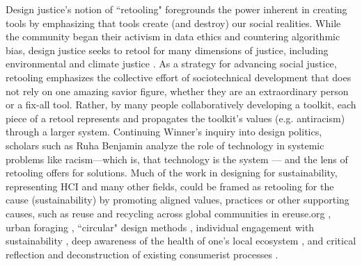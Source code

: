 Design justice's notion of ``retooling" foregrounds the power inherent in creating tools by emphasizing that tools create (and destroy) our social realities. While the community began their activism in data ethics and countering algorithmic bias, design justice seeks to retool for many dimensions of justice, including environmental and climate justice \todo{[153]}. As a strategy for advancing social justice, retooling emphasizes the collective effort of sociotechnical development that does not rely on one amazing savior figure, whether they are an extraordinary person or a fix-all tool. Rather, by many people collaboratively developing a toolkit, each piece of a retool represents and propagates the toolkit's values (e.g. antiracism) through a larger system. Continuing Winner's inquiry into design politics, scholars such as Ruha Benjamin analyze the role of technology in systemic problems like racism---which is, that technology is the system \cite{benjamin_race_2019} --- and the lens of retooling offers  for solutions. Much of the work in designing for sustainability, representing HCI and many other fields, could be framed as retooling for the cause (sustainability) by promoting aligned values, practices or other supporting causes, such as reuse and recycling across global communities in ereuse.org \cite{franquesa_circular_2016}, urban foraging \cite{disalvo_fruit_2017}, ``circular" design methods \todo{[141]}, individual engagement with sustainability \todo{[39,41]}, deep awareness of the health of one's local ecosystem \todo{[8,73,78,149]}, and critical reflection and deconstruction of existing consumerist processes \todo{[19,101,107,117]}.

